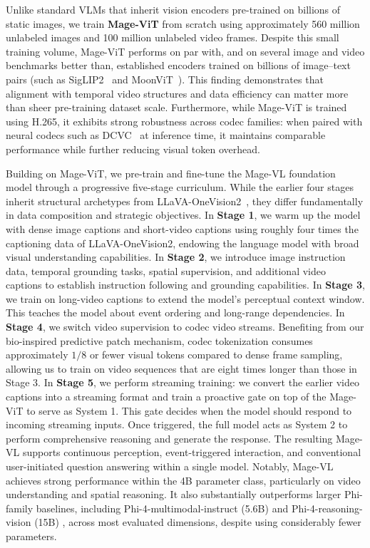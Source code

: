 Unlike standard VLMs that inherit vision encoders pre-trained on billions of static images, we train \textbf{Mage-ViT} from scratch using approximately 560 million unlabeled images and 100 million unlabeled video frames. Despite this small training volume, Mage-ViT performs on par with, and on several image and video benchmarks better than, established encoders trained on billions of image--text pairs (such as SigLIP2~\cite{tschannen2025siglip} and MoonViT~\cite{kimi2025vl}). This finding demonstrates that alignment with temporal video structures and data efficiency can matter more than sheer pre-training dataset scale. Furthermore, while Mage-ViT is trained using H.265, it exhibits strong robustness across codec families: when paired with neural codecs such as DCVC~\cite{li2021dcvc} at inference time, it maintains comparable performance while further reducing visual token overhead.




Building on Mage-ViT, we pre-train and fine-tune the Mage-VL foundation model through a progressive five-stage curriculum. While the earlier four stages inherit structural archetypes from LLaVA-OneVision2~\cite{llavaonevision2}, they differ fundamentally in data composition and strategic objectives. In \textbf{Stage 1}, we warm up the model with dense image captions and short-video captions using roughly four times the captioning data of LLaVA-OneVision2, endowing the language model with broad visual understanding capabilities. In \textbf{Stage 2}, we introduce image instruction data, temporal grounding tasks, spatial supervision, and additional video captions to establish instruction following and grounding capabilities. In \textbf{Stage 3}, we train on long-video captions to extend the model's perceptual context window. This teaches the model about event ordering and long-range dependencies. In \textbf{Stage 4}, we switch video supervision to codec video streams. Benefiting from our bio-inspired predictive patch mechanism, codec tokenization consumes approximately $1/8$ or fewer visual tokens compared to dense frame sampling, allowing us to train on video sequences that are eight times longer than those in Stage 3. In \textbf{Stage 5}, we perform streaming training: we convert the earlier video captions into a streaming format and train a proactive gate on top of the Mage-ViT to serve as System 1. This gate decides when the model should respond to incoming streaming inputs. Once triggered, the full model acts as System 2 to perform comprehensive reasoning and generate the response. The resulting Mage-VL supports continuous perception, event-triggered interaction, and conventional user-initiated question answering within a single model. Notably, Mage-VL achieves strong performance within the 4B parameter class, particularly on video understanding and spatial reasoning. It also substantially outperforms larger Phi-family baselines, including Phi-4-multimodal-instruct (5.6B) \cite{abdin2024phi4} and Phi-4-reasoning-vision (15B) \cite{aneja2026phi4reasoningvision15btechnicalreport}, across most evaluated dimensions, despite using considerably fewer parameters.

